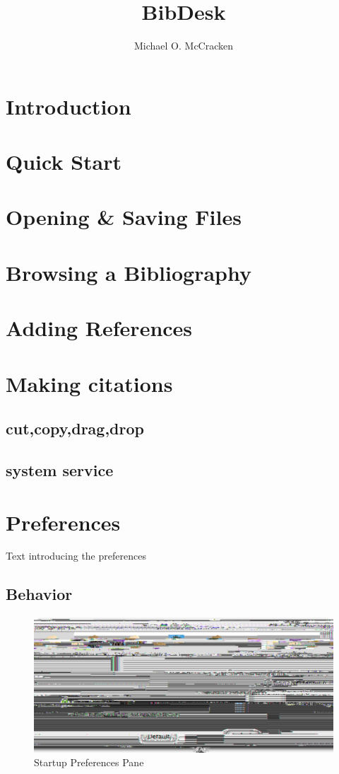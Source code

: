 \documentclass[11pt]{book}
\title{BibDesk}
\author{Michael O. McCracken}
\newif\ifpdf
\begin{document}
\ifpdf
\DeclareGraphicsExtensions{.pdf, .jpg, .tif}
\else
{}
\fi

\maketitle

\tableofcontents
\listoffigures

\chapter{Introduction}
\chapter{Quick Start}
\chapter{Opening \& Saving Files}
\chapter{Browsing a Bibliography}
\chapter{Adding References}
\chapter{Making citations}
	\section{cut,copy,drag,drop}
	\section{system service}
\chapter{Preferences}
Text introducing the preferences
\section{Behavior}
\begin{figure}[h]
\centerline{
\includegraphics[scale=.75]{images/pref_Startup}
}
\label{pref_Startup}
\caption{Startup Preferences Pane}
\end{figure}
\end{document}
